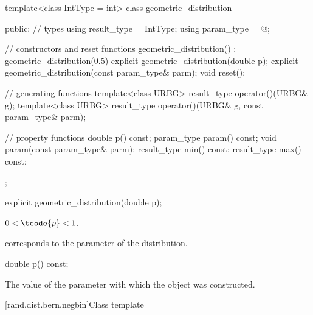 %
%
\begin{codeblock}
template<class IntType = int>
  class geometric_distribution {
  public:
    // types
    using result_type = IntType;
    using param_type  = @\unspec@;

    // constructors and reset functions
    geometric_distribution() : geometric_distribution(0.5) {}
    explicit geometric_distribution(double p);
    explicit geometric_distribution(const param_type& parm);
    void reset();

    // generating functions
    template<class URBG>
      result_type operator()(URBG& g);
    template<class URBG>
      result_type operator()(URBG& g, const param_type& parm);

    // property functions
    double p() const;
    param_type param() const;
    void param(const param_type& parm);
    result_type min() const;
    result_type max() const;
  };
\end{codeblock}


%
\begin{itemdecl}
explicit geometric_distribution(double p);
\end{itemdecl}

\begin{itemdescr}
\pnum
\expects
$0 < \tcode{p} < 1$.

\pnum
\remarks
 corresponds to the parameter of the distribution.
\end{itemdescr}

%
\begin{itemdecl}
double p() const;
\end{itemdecl}

\begin{itemdescr}
\pnum
\returns
The value of the  parameter
 with which the object was constructed.
\end{itemdescr}


[rand.dist.bern.negbin]{Class template }
%
%

